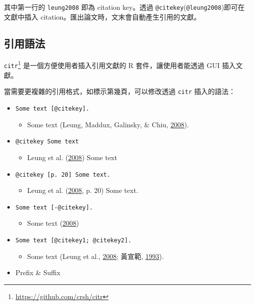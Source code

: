 \documentclass[oneside]{book}
\renewcommand{\href}[2]{#2\footnote{\url{#1}}}
\providecommand{\tightlist}{%
  \setlength{\itemsep}{0pt}\setlength{\parskip}{0pt}}
\begin{document}
其中第一行的 \texttt{leung2008} 即為 citation key。透過 \texttt{@citekey}(\texttt{@leung2008})即可在文獻中插入 citation。匯出論文時，文末會自動產生引用的文獻。

\hypertarget{cite-syntax}{%
\subsection{引用語法}\label{cite-syntax}}

\href{https://github.com/crsh/citr}{\texttt{citr}} 是一個方便使用者插入引用文獻的 R 套件，讓使用者能透過 GUI 插入文獻。

當需要更複雜的引用格式，如標示第幾頁，可以修改透過 \texttt{citr} 插入的語法：

\begin{itemize}
\tightlist
\item
  \texttt{Some\ text\ {[}@citekey{]}.}

  \begin{itemize}
  \tightlist
  \item
    Some text (Leung, Maddux, Galinsky, \& Chiu, \protect\hyperlink{ref-leung2008}{2008}).
  \end{itemize}
\item
  \texttt{@citekey\ Some\ text}

  \begin{itemize}
  \tightlist
  \item
    Leung et al. (\protect\hyperlink{ref-leung2008}{2008}) Some text
  \end{itemize}
\item
  \texttt{@citekey\ {[}p.\ 20{]}\ Some\ text.}

  \begin{itemize}
  \tightlist
  \item
    Leung et al. (\protect\hyperlink{ref-leung2008}{2008}, p. 20) Some text.
  \end{itemize}
\item
  \texttt{Some\ text\ {[}-@citekey{]}.}

  \begin{itemize}
  \tightlist
  \item
    Some text (\protect\hyperlink{ref-leung2008}{2008})
  \end{itemize}
\item
  \texttt{Some\ text\ {[}@citekey1;\ @citekey2{]}.}

  \begin{itemize}
  \tightlist
  \item
    Some text (Leung et al., \protect\hyperlink{ref-leung2008}{2008}; 黃宣範, \protect\hyperlink{ref-huangxuanfan1993}{1993}).
  \end{itemize}
\item
  Prefix \& Suffix


\end{itemize}
\end{document}
